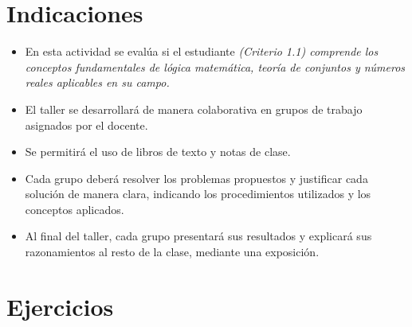 \documentclass[11pt,a4]{aleph-examen}
\begin{document}
\encabezado

\section*{Indicaciones}
\begin{itemize}[leftmargin=*]
\item 
    En esta actividad se evalúa si el estudiante \textit{(Criterio 1.1) comprende los conceptos fundamentales de lógica matemática, teoría de conjuntos y números reales aplicables en su campo.}
\item 
    El taller se desarrollará de manera colaborativa en grupos de trabajo asignados por el docente.
\item 
    Se permitirá el uso de libros de texto y notas de clase.
\item 
    Cada grupo deberá resolver los problemas propuestos y justificar cada solución de manera clara, indicando los procedimientos utilizados y los conceptos aplicados.
\item 
    Al final del taller, cada grupo presentará sus resultados y explicará sus razonamientos al resto de la clase, mediante una exposición.
\end{itemize}

\section*{Ejercicios}
\end{document}
